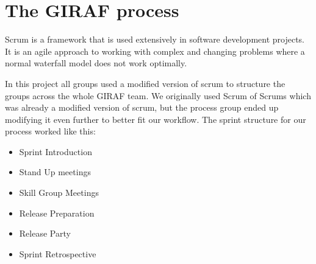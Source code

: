 \section{The GIRAF process}\label{the-giraf-process}
Scrum is a framework that is used extensively in software development projects.
It is an agile approach to working with complex and changing problems where a normal waterfall model does not work optimally.

In this project all groups used a modified version of scrum to structure the groups across the whole GIRAF team.
We originally used Scrum of Scrums which was already a modified version of scrum, but the process group ended up modifying it even further to better fit our workflow.
The sprint structure for our process worked like this:

\begin{itemize}
    \item Sprint Introduction
    \item Stand Up meetings
    \item Skill Group Meetings
    \item Release Preparation
    \item Release Party
    \item Sprint Retrospective
\end{itemize}

